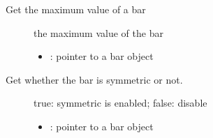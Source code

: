 \documentclass[letterpaper,10pt,english]{sphinxmanual}
\begin{document}

\begin{fulllineitems}
\label{\detokenize{object-types/bar:_CPPv420lv_bar_get_max_valuePK8lv_obj_t}}%
\pysigstartmultiline
{}\label{\detokenize{object-types/bar:lv__bar_8h_1a070e92061e9c4f24046e3948921fcedc}}%
\pysigstopmultiline
Get the maximum value of a bar \begin{description}
\item[{}] \leavevmode
the maximum value of the bar 

\item[{}] \leavevmode\begin{itemize}
\item {} 
: pointer to a bar object 

\end{itemize}

\end{description}


\end{fulllineitems}


\begin{fulllineitems}
\label{\detokenize{object-types/bar:_CPPv414lv_bar_get_symP8lv_obj_t}}%
\pysigstartmultiline
{}\label{\detokenize{object-types/bar:lv__bar_8h_1a21b6fd59d607161d5885e0183e486d06}}%
\pysigstopmultiline
Get whether the bar is symmetric or not. \begin{description}
\item[{}] \leavevmode
true: symmetric is enabled; false: disable 

\item[{}] \leavevmode\begin{itemize}
\item {} 
: pointer to a bar object 

\end{itemize}

\end{description}


\end{fulllineitems}
\end{document}
